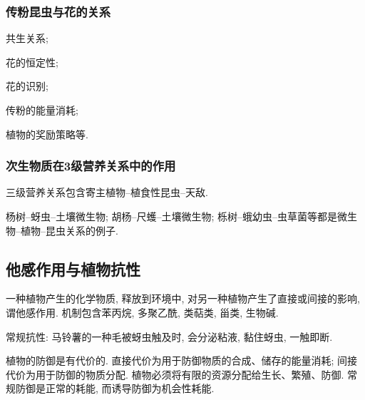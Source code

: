 \documentclass{ctexart}
\begin{document}

\subsubsection{传粉昆虫与花的关系} %
\label{ssub:传粉昆虫与花的关系}

\begin{cenum}
    \item 共生关系;
    \item 花的恒定性;
    \item 花的识别;
    \item 传粉的能量消耗;
    \item 植物的奖励策略等.
\end{cenum}


\subsubsection{次生物质在3级营养关系中的作用} %
\label{ssub:次生物质在3级营养关系中的作用}

三级营养关系包含寄主植物--植食性昆虫--天敌.
\begin{ex}
    杨树--蚜虫--土壤微生物; 胡杨--尺蠖--土壤微生物; 栎树--蛾幼虫--虫草菌等都是微生物--植物--昆虫关系的例子.
\end{ex}



\subsection{他感作用与植物抗性} %
\label{sub:他感作用与植物抗性}

一种植物产生的化学物质, 释放到环境中, 对另一种植物产生了直接或间接的影响, 谓他感作用. 机制包含苯丙烷, 多聚乙酰, 类萜类, 甾类, 生物碱.

\begin{ex}
    常规抗性: 马铃薯的一种毛被蚜虫触及时, 会分泌粘液, 黏住蚜虫, 一触即断.
\end{ex}

植物的防御是有代价的. 直接代价为用于防御物质的合成、储存的能量消耗; 间接代价为用于防御的物质分配. 植物必须将有限的资源分配给生长、繁殖、防御. 常规防御是正常的耗能, 而诱导防御为机会性耗能.


\end{document}
